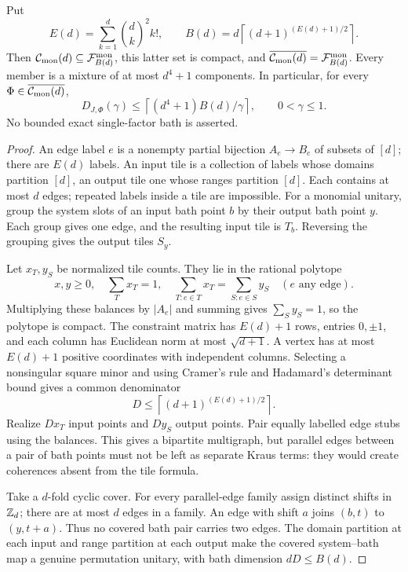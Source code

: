 \begin{theorem}\label{thm:monomial-mixture}
Put
\[
 E(d)=\sum_{k=1}^d\binom dk^2k!,\qquad
 B(d)=d\left\lceil(d+1)^{(E(d)+1)/2}\right\rceil .
\]
Then $\mathcal C_{\rm mon}(d)\subseteq\mathcal F_{B(d)}^{\rm mon}$, this latter set is compact, and
$\overline{\mathcal C_{\rm mon}(d)}=\mathcal F_{B(d)}^{\rm mon}$.
Every member is a mixture of at most $d^4+1$ components. In particular, for every $\Phi\in\overline{\mathcal C_{\rm mon}(d)}$,
\[
 D_{J,\Phi}(\gamma)\le\left\lceil(d^4+1)B(d)/\gamma\right\rceil,\qquad 0<\gamma\le1.
\]
No bounded exact single-factor bath is asserted.
\end{theorem}
\begin{proof}
An edge label $e$ is a nonempty partial bijection $A_e\to B_e$ of subsets of $[d]$; there are $E(d)$ labels.
An input tile is a collection of labels whose domains partition $[d]$, an output tile one whose ranges partition $[d]$.
Each contains at most $d$ edges; repeated labels inside a tile are impossible.
For a monomial unitary, group the system slots of an input bath point $b$ by their output bath point $y$.
Each group gives one edge, and the resulting input tile is $T_b$. Reversing the grouping gives the output tiles $S_y$.

Let $x_T,y_S$ be normalized tile counts. They lie in the rational polytope
\[
 x,y\ge0,\quad\sum_Tx_T=1,\quad
 \sum_{T:e\in T}x_T=\sum_{S:e\in S}y_S\quad(e\text{ any edge}).
\]
Multiplying these balances by $|A_e|$ and summing gives $\sum_Sy_S=1$, so the polytope is compact.
The constraint matrix has $E(d)+1$ rows, entries $0,\pm1$, and each column has Euclidean norm at most $\sqrt{d+1}$.
A vertex has at most $E(d)+1$ positive coordinates with independent columns.
Selecting a nonsingular square minor and using Cramer's rule and Hadamard's determinant bound gives a common denominator
\[
 D\le\left\lceil(d+1)^{(E(d)+1)/2}\right\rceil .
\]
Realize $Dx_T$ input points and $Dy_S$ output points. Pair equally labelled edge stubs using the balances.
This gives a bipartite multigraph, but parallel edges between a pair of bath points must not be left as separate Kraus terms:
they would create coherences absent from the tile formula.

Take a $d$-fold cyclic cover. For every parallel-edge family assign distinct shifts in $\mathbb Z_d$; there are at most $d$ edges in a family.
An edge with shift $a$ joins $(b,t)$ to $(y,t+a)$.
Thus no covered bath pair carries two edges. The domain partition at each input and range partition at each output make the covered
system--bath map a genuine permutation unitary, with bath dimension $dD\le B(d)$.


\end{proof}
